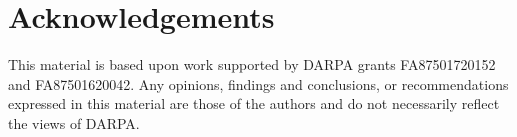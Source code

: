 \documentclass[letterpaper]{article} %
\begin{document}
\section{Acknowledgements}
This material is based upon work supported by DARPA grants FA87501720152 and FA87501620042. Any opinions, findings and conclusions, or recommendations expressed in this material are those of the authors and do not necessarily reflect the views of DARPA.



\end{document}

